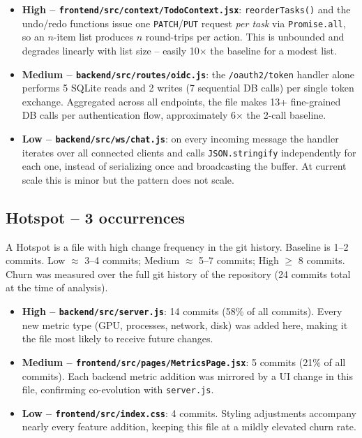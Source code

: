 \begin{itemize}
  \item \textbf{High -- \texttt{frontend/src/context/TodoContext.jsx}}:
    \texttt{reorderTasks()} and the undo/redo functions issue one
    \texttt{PATCH}/\texttt{PUT} request \emph{per task} via
    \texttt{Promise.all}, so an $n$-item list produces $n$ round-trips per
    action. This is unbounded and degrades linearly with list size -- easily
    10$\times$ the baseline for a modest list.

  \item \textbf{Medium -- \texttt{backend/src/routes/oidc.js}}: the
    \texttt{/oauth2/token} handler alone performs 5 SQLite reads and 2 writes
    (7 sequential DB calls) per single token exchange. Aggregated across all
    endpoints, the file makes 13+ fine-grained DB calls per authentication
    flow, approximately 6$\times$ the 2-call baseline.

  \item \textbf{Low -- \texttt{backend/src/ws/chat.js}}: on every incoming
    message the handler iterates over all connected clients and calls
    \texttt{JSON.stringify} independently for each one, instead of serializing
    once and broadcasting the buffer. At current scale this is minor but the
    pattern does not scale.
\end{itemize}

\subsection*{Hotspot -- 3 occurrences}

A Hotspot is a file with high change frequency in the git history. Baseline
is 1--2 commits. Low $\approx$ 3--4 commits; Medium $\approx$ 5--7 commits;
High $\geq$ 8 commits. Churn was measured over the full git history of the
repository (24 commits total at the time of analysis).

\begin{itemize}
  \item \textbf{High -- \texttt{backend/src/server.js}}: 14 commits (58\% of
    all commits). Every new metric type (GPU, processes, network, disk) was
    added here, making it the file most likely to receive future changes.

  \item \textbf{Medium -- \texttt{frontend/src/pages/MetricsPage.jsx}}: 5
    commits (21\% of all commits). Each backend metric addition was mirrored
    by a UI change in this file, confirming co-evolution with
    \texttt{server.js}.

  \item \textbf{Low -- \texttt{frontend/src/index.css}}: 4 commits. Styling
    adjustments accompany nearly every feature addition, keeping this file at
    a mildly elevated churn rate.
\end{itemize}

